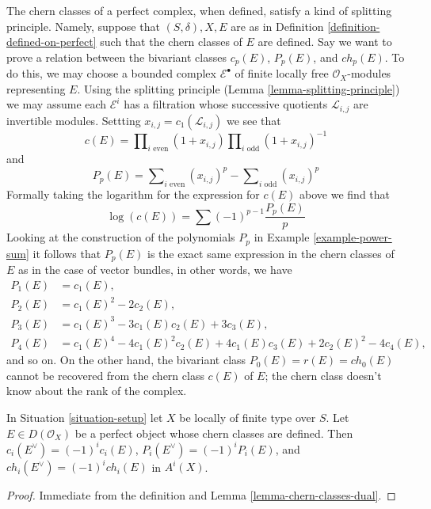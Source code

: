 \begin{remark}
\label{remark-splitting-principle-perfect}
The chern classes of a perfect complex, when defined, satisfy a kind of
splitting principle. Namely, suppose that $(S, \delta), X, E$ are as in
Definition \ref{definition-defined-on-perfect}
such that the chern classes of $E$ are defined.
Say we want to prove a relation between the bivariant classes
$c_p(E)$, $P_p(E)$, and $ch_p(E)$. To do this, we may choose a bounded
complex $\mathcal{E}^\bullet$ of finite locally free $\mathcal{O}_X$-modules
representing $E$. Using the splitting principle
(Lemma \ref{lemma-splitting-principle}) we may assume each
$\mathcal{E}^i$ has a filtration whose successive
quotients $\mathcal{L}_{i, j}$ are invertible modules.
Settting $x_{i, j} = c_1(\mathcal{L}_{i, j})$ we see that
$$
c(E) =
\prod\nolimits_{i\text{ even}} (1 + x_{i, j})
\prod\nolimits_{i\text{ odd}} (1 + x_{i, j})^{-1}
$$
and
$$
P_p(E) =  \sum\nolimits_{i\text{ even}} (x_{i, j})^p -
\sum\nolimits_{i\text{ odd}} (x_{i, j})^p
$$
Formally taking the logarithm for the expression for $c(E)$ above
we find that
$$
\log(c(E)) = \sum (-1)^{p - 1}\frac{P_p(E)}{p}
$$
Looking at the construction of the polynomials $P_p$ in
Example \ref{example-power-sum} it follows that $P_p(E)$
is the exact same expression in the chern classes of $E$
as in the case of vector bundles, in other words, we have
\begin{align*}
P_1(E) & = c_1(E), \\
P_2(E) & = c_1(E)^2 - 2c_2(E), \\
P_3(E) & = c_1(E)^3 - 3c_1(E)c_2(E) + 3c_3(E), \\
P_4(E) & = c_1(E)^4 - 4c_1(E)^2c_2(E) + 4c_1(E)c_3(E) + 2c_2(E)^2 - 4c_4(E),
\end{align*}
and so on. On the other hand, the bivariant class $P_0(E) = r(E) = ch_0(E)$
cannot be recovered from the chern class $c(E)$ of $E$; the chern class
doesn't know about the rank of the complex.
\end{remark}

\begin{lemma}
\label{lemma-chern-classes-perfect-dual}
In Situation \ref{situation-setup} let $X$ be locally of finite type over $S$.
Let $E \in D(\mathcal{O}_X)$ be a perfect object whose chern classes are
defined. Then $c_i(E^\vee) = (-1)^i c_i(E)$, $P_i(E^\vee) = (-1)^iP_i(E)$,
and $ch_i(E^\vee) = (-1)^ich_i(E)$ in $A^i(X)$.
\end{lemma}

\begin{proof}
Immediate from the definition and Lemma \ref{lemma-chern-classes-dual}.
\end{proof}

